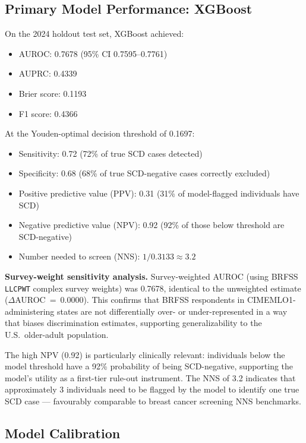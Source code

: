 \documentclass[12pt,a4paper]{article}
\begin{document}
\subsection{Primary Model Performance: XGBoost}

On the 2024 holdout test set, XGBoost achieved:
\begin{itemize}[noitemsep]
  \item AUROC: 0.7678 (95\% CI 0.7595--0.7761)
  \item AUPRC: 0.4339
  \item Brier score: 0.1193
  \item F1 score: 0.4366
\end{itemize}

At the Youden-optimal decision threshold of 0.1697:
\begin{itemize}[noitemsep]
  \item Sensitivity: 0.72 (72\% of true SCD cases detected)
  \item Specificity: 0.68 (68\% of true SCD-negative cases correctly excluded)
  \item Positive predictive value (PPV): 0.31 (31\% of model-flagged individuals have SCD)
  \item Negative predictive value (NPV): 0.92 (92\% of those below threshold are SCD-negative)
  \item Number needed to screen (NNS): $1/0.3133 \approx 3.2$
\end{itemize}

\noindent\textbf{Survey-weight sensitivity analysis.} Survey-weighted AUROC (using BRFSS \texttt{LLCPWT} complex survey weights) was 0.7678, identical to the unweighted estimate ($\Delta$AUROC~=~0.0000). This confirms that BRFSS respondents in CIMEMLO1-administering states are not differentially over- or under-represented in a way that biases discrimination estimates, supporting generalizability to the U.S.\ older-adult population.

The high NPV (0.92) is particularly clinically relevant: individuals below the
model threshold have a 92\% probability of being SCD-negative, supporting the
model's utility as a first-tier rule-out instrument. The NNS of 3.2 indicates
that approximately 3 individuals need to be flagged by the model to identify
one true SCD case --- favourably comparable to breast cancer screening NNS
benchmarks.

\subsection{Model Calibration}
\end{document}
